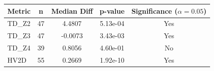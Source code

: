 \begin{tabular}{lcccc}
\toprule
\textbf{Metric} & \textbf{n} & \textbf{Median Diff} & \textbf{p-value} & \textbf{Significance ($\alpha=0.05$)} \\
\midrule
TD\_Z2 & 47 & 4.4807 & 5.13e-04 & Yes \\
TD\_Z3 & 47 & -0.0073 & 3.43e-03 & Yes \\
TD\_Z4 & 39 & 0.8056 & 4.60e-01 & No \\
HV2D & 55 & 0.2669 & 1.92e-10 & Yes \\
\bottomrule
\end{tabular}
